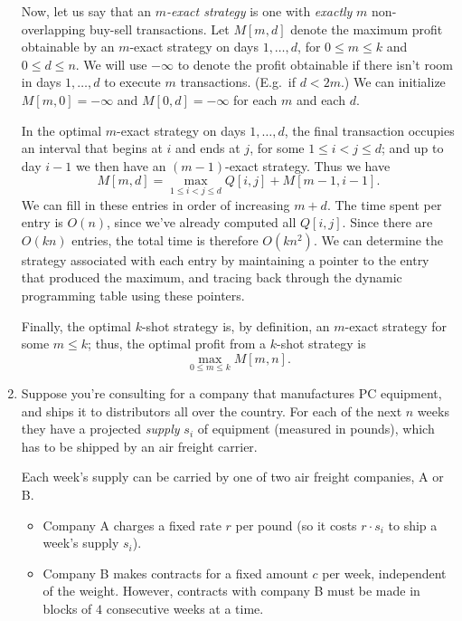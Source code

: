 \documentclass[12pt]{article}
\begin{document}
\begin{enumerate}
{Now, let us say that an {\em $m$-exact strategy}
is one with {\em exactly} $m$ non-overlapping buy-sell transactions.
Let $M[m,d]$ denote the maximum profit obtainable 
by an $m$-exact strategy on days $1, \ldots, d$,
for $0 \leq m \leq k$ and $0 \leq d \leq n$.
We will use $-\infty$ to denote the profit obtainable
if there isn't room in days $1, \ldots, d$ to execute
$m$ transactions.  (E.g.~if $d < 2m$.)
We can initialize $M[m,0] = -\infty$ and $M[0,d] = -\infty$
for each $m$ and each $d$.

In the optimal $m$-exact strategy on days
$1, \ldots, d$, the final transaction occupies an 
interval that begins at $i$ and ends at $j$,
for some $1 \leq i < j \leq d$;
and up to day $i-1$ we then have an $(m-1)$-exact strategy.
Thus we have
$$M[m,d] = \max_{1 \leq i < j \leq d} Q[i,j] + M[m-1,i-1].$$
We can fill in these entries in order of increasing $m + d$.
The time spent per entry is $O(n)$, 
since we've already computed all $Q[i,j]$.
Since there are $O(kn)$ entries, the total time is therefore $O(kn^2)$.
We can determine the strategy associated with
each entry by maintaining a pointer to the entry 
that produced the maximum, and tracing back through
the dynamic programming table using these pointers.

Finally, the optimal $k$-shot strategy is, by definition,
an $m$-exact strategy for some $m \leq k$;
thus, the optimal profit from a $k$-shot strategy is
$$\max_{0 \leq m \leq k} M[m,n].$$
}





\item

Suppose you're consulting for a company that manufactures
PC equipment, and ships it to distributors all over the country.
For each of the next $n$ weeks they have a projected
{\em supply} $s_i$ of equipment (measured in pounds),
which has to be shipped by an air freight carrier.

Each week's supply can be carried by one of two air freight companies, A or B.
\begin{itemize}
\item Company A charges a fixed rate $r$ per pound
(so it costs $r \cdot s_i$ to ship a week's supply $s_i$).
\item Company B makes contracts for a fixed amount $c$ per week,
independent of the weight.  However, contracts with
company B must be made in blocks of $4$ consecutive weeks at a time.
\end{itemize}


\end{enumerate}
\end{document}
